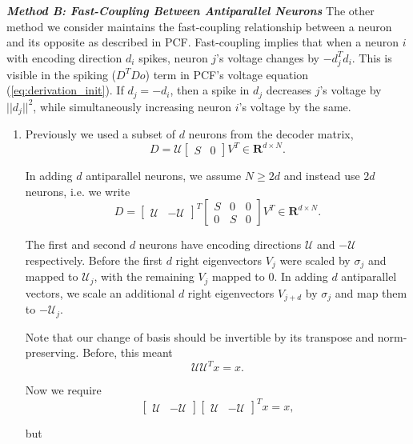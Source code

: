 \clearpage

\textbf{\textit{Method B: Fast-Coupling Between Antiparallel Neurons}} The other method we consider maintains the fast-coupling relationship between a neuron and its opposite as described in PCF. Fast-coupling implies that when a neuron $i$ with encoding direction $d_i$ spikes, neuron $j$'s voltage changes by $-d_j^T d_i$. This is visible in the spiking ($D^TDo$) term in PCF's voltage equation (\ref{eq:derivation_init}). If $d_j = -d_i$, then a spike in $d_j$ decreases $j$'s voltage by $||d_j||^2$, while simultaneously increasing neuron $i$'s voltage by the same. 

\begin{enumerate}



\item  Previously we used a subset of $d$ neurons from the decoder matrix, 
$$
D = \mathcal{U} \begin{bmatrix}
S & 0
\end{bmatrix}
V^T \in \mathbf{R}^{d \times N}.
$$

In adding $d$ antiparallel neurons, we assume $N \geq 2d$ and instead use $2d$ neurons, i.e. we write
$$
D = \begin{bmatrix}
\mathcal{U} & -\mathcal{U}
\end{bmatrix}^T \begin{bmatrix}
S & 0 & 0
\\
0 & S & 0
\end{bmatrix}
V^T \in \mathbf{R}^{d \times N}.
$$

The first and second $d$ neurons have encoding directions $\mathcal{U}$ and $-\mathcal{U}$ respectively. Before the first $d$ right eigenvectors $V_j$ were scaled by $\sigma_j$ and mapped to $\mathcal{U}_j$, with the remaining $V_j$ mapped to $0$. In adding $d$ antiparallel vectors, we scale an additional $d$ right eigenvectors $V_{j+d}$ by $\sigma_j$ and map them to $-\mathcal{U}_j$. 


Note that our change of basis should be invertible by its transpose and norm-preserving. Before, this meant
$$
\mathcal{U} \mathcal{U}^T x = x.
$$

Now we require
$$
\begin{bmatrix}
\mathcal{U} & -\mathcal{U}
\end{bmatrix} \begin{bmatrix}
\mathcal{U} & -\mathcal{U}
\end{bmatrix}^T x = x,
$$

but 


\end{enumerate}
